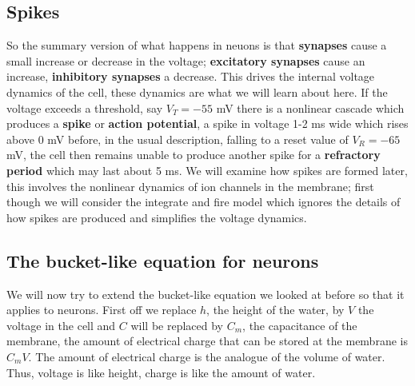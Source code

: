 \documentclass{article}
\begin{document}
\subsection*{Spikes}

So the summary version of what happens in neuons is that
\textbf{synapses} cause a small increase or decrease in the voltage;
\textbf{excitatory synapses} cause an increase, \textbf{inhibitory
  synapses} a decrease. This drives the internal voltage dynamics of
the cell, these dynamics are what we will learn about here. If the
voltage exceeds a threshold, say $V_T=-55$ mV there is a nonlinear
cascade which produces a \textbf{spike} or \textbf{action potential},
a spike in voltage 1-2 ms wide which rises above 0 mV before, in the
usual description, falling to a reset value of $V_R=-65$ mV, the cell
then remains unable to produce another spike for a \textbf{refractory
  period} which may last about 5 ms. We will examine how spikes are
formed later, this involves the nonlinear dynamics of ion channels in
the membrane; first though we will consider the integrate and fire
model which ignores the details of how spikes are produced and
simplifies the voltage dynamics.

\subsection*{The bucket-like equation for neurons}

We will now try to extend the bucket-like equation we looked at before
so that it applies to neurons. First off we replace $h$, the height of
the water, by $V$ the voltage in the cell and $C$ will be replaced by
$C_m$, the capacitance of the membrane, the amount of electrical
charge that can be stored at the membrane is $C_mV$. The amount of
electrical charge is the analogue of the volume of water. Thus,
voltage is like height, charge is like the amount of water.
\end{document}
